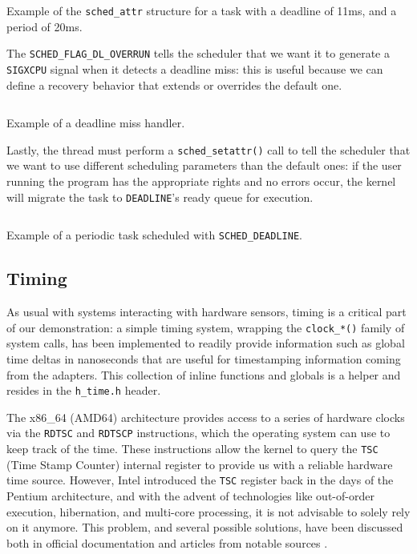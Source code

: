 \documentclass[a4paper,12pt]{report}
\begin{document}
\begin{listing}[H]
\inputminted[frame=single,framesep=10pt]{c}{snippets/sched-attr.c}
\caption{Example of the \texttt{sched\_attr} structure for a task with a deadline of 11ms, and a period of 20ms.}
\end{listing}

The \texttt{SCHED\_FLAG\_DL\_OVERRUN} tells the scheduler that we want it to generate a \texttt{SIGXCPU} signal when it detects a deadline miss: this is useful because we can define a recovery behavior that extends or overrides the default one.

\begin{listing}[H]
\inputminted[frame=single,framesep=10pt]{c}{snippets/dl-miss-handler.c}
\caption{Example of a deadline miss handler.}
\end{listing}

Lastly, the thread must perform a \texttt{sched\_setattr()} call to tell the scheduler that we want to use different scheduling parameters than the default ones: if the user running the program has the appropriate rights and no errors occur, the kernel will migrate the task to \texttt{DEADLINE}'s ready queue for execution.

\begin{listing}[H]
\inputminted[frame=single,framesep=10pt]{c}{snippets/entry-point.c}
\caption{Example of a periodic task scheduled with \texttt{SCHED\_DEADLINE}.}
\end{listing}


\subsection{Timing}

As usual with systems interacting with hardware sensors, timing is a critical part of our demonstration: a simple timing system, wrapping the \texttt{clock\_*()} family of system calls, has been implemented to readily provide information such as global time deltas in nanoseconds that are useful for timestamping information coming from the adapters. This collection of inline functions and globals is a helper and resides in the \texttt{h\_time.h} header. 

The x86\_64 (AMD64) architecture provides access to a series of hardware clocks via the \texttt{RDTSC} and \texttt{RDTSCP} instructions, which the operating system can use to keep track of the time. These instructions allow the kernel to query the \texttt{TSC} (Time Stamp Counter) internal register to provide us with a reliable hardware time source. However, Intel introduced the \texttt{TSC} register back in the days of the Pentium architecture, and with the advent of technologies like out-of-order execution, hibernation, and multi-core processing, it is not advisable to solely rely on it anymore. This problem, and several possible solutions, have been discussed both in official documentation \cite{intel-rdtsc-bench} and articles from notable sources \cite{ms-rdtsc-issues}.
\end{document}
